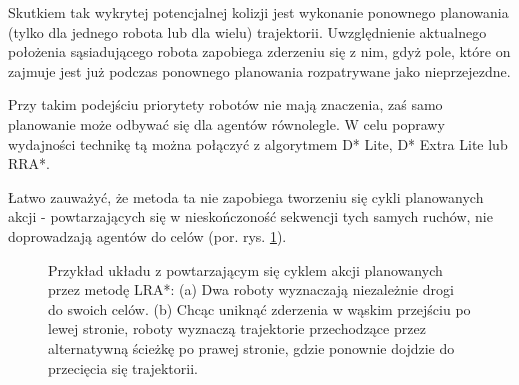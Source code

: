
Skutkiem tak wykrytej potencjalnej kolizji jest wykonanie ponownego planowania (tylko dla jednego robota lub dla wielu) trajektorii. Uwzględnienie aktualnego położenia sąsiadującego robota zapobiega zderzeniu się z nim, gdyż pole, które on zajmuje jest już podczas ponownego planowania rozpatrywane jako nieprzejezdne.

Przy takim podejściu priorytety robotów nie mają znaczenia, zaś samo planowanie może odbywać się dla agentów równolegle.
W celu poprawy wydajności technikę tą można połączyć z algorytmem D* Lite, D* Extra Lite lub RRA*.

Łatwo zauważyć, że metoda ta nie zapobiega tworzeniu się cykli planowanych akcji - powtarzających się w nieskończoność sekwencji tych samych ruchów, nie doprowadzają agentów do celów (por. rys. \ref{fig:robopath-lra-cycle}).

\begin{figure}
	\centering
		\qquad
	\caption{Przykład układu z powtarzającym się cyklem akcji planowanych przez metodę LRA*:
	(a) Dwa roboty wyznaczają niezależnie drogi do swoich celów.
	(b) Chcąc uniknąć zderzenia w wąskim przejściu po lewej stronie, roboty wyznaczą trajektorie przechodzące przez alternatywną ścieżkę po prawej stronie, gdzie ponownie dojdzie do przecięcia się trajektorii.}
	\label{fig:robopath-lra-cycle}
\end{figure}


